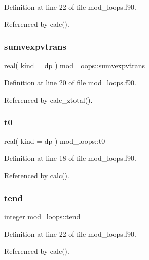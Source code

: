 Definition at line 22 of file mod\+\_\+loops.\+f90.



Referenced by calc().

\mbox{\label{namespacemod__loops_a7c4cc7b204cbf0459e4519befe2b1ef5}} 
\subsubsection{\texorpdfstring{sumvexpvtrans}{sumvexpvtrans}}
{\footnotesize\ttfamily real( kind = dp ) mod\+\_\+loops\+::sumvexpvtrans}



Definition at line 20 of file mod\+\_\+loops.\+f90.



Referenced by calc\+\_\+ztotal().

\mbox{\label{namespacemod__loops_ab6a118712ba0b676790e9cace45c35b5}} 
\subsubsection{\texorpdfstring{t0}{t0}}
{\footnotesize\ttfamily real( kind = dp ) mod\+\_\+loops\+::t0}



Definition at line 18 of file mod\+\_\+loops.\+f90.



Referenced by calc().

\mbox{\label{namespacemod__loops_a67ea99979384ac6268ae84f7bd2773ec}} 
\subsubsection{\texorpdfstring{tend}{tend}}
{\footnotesize\ttfamily integer mod\+\_\+loops\+::tend}



Definition at line 22 of file mod\+\_\+loops.\+f90.



Referenced by calc().

